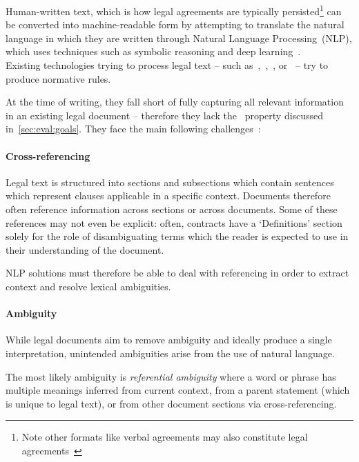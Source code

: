 Human-written text, which is how legal agreements are typically persisted\footnote{Note other formats like verbal agreements may also constitute legal agreements~\cite{larsonContractLawIntro}} can be converted into machine-readable form by attempting to translate the natural language in which they are written through Natural Language Processing~(NLP), which uses techniques such as symbolic reasoning and deep learning~\cite{GoldbergNLPReview}.\\

Existing technologies trying to process legal text -- such as~\cite{angeli2015NLP1},~\cite{lapata2016NLP2},~\cite{lapata2018NLP3}, or~\cite{sleimi2018NLP4} -- try to produce normative rules.

At the time of writing, they fall short of fully capturing all relevant information in an existing legal document -- therefore they lack the~ property discussed in~\autoref{sec:eval:goals}.
They face the main following challenges~\cite{ferraroLegalNLPSSurvey}:

\paragraph{Cross-referencing}

Legal text is structured into sections and subsections which contain sentences which represent clauses applicable in a specific context.
Documents therefore often reference information across sections or across documents.
Some of these references may not even be explicit: often, contracts have a `Definitions' section solely for the role of disambiguating terms which the reader is expected to use in their understanding of the document.

NLP solutions must therefore be able to deal with referencing in order to extract context and resolve lexical ambiguities.

\paragraph{Ambiguity}
While legal documents aim to remove ambiguity and ideally produce a single interpretation, unintended ambiguities arise from the use of natural language.

The most likely ambiguity is \emph{referential ambiguity} where a word or phrase has multiple meanings inferred from current context, from a parent statement (which is unique to legal text), or from other document sections via cross-referencing.

